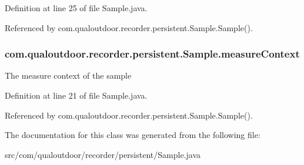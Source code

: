 Definition at line 25 of file Sample.\-java.



Referenced by com.\-qualoutdoor.\-recorder.\-persistent.\-Sample.\-Sample().

\hypertarget{classcom_1_1qualoutdoor_1_1recorder_1_1persistent_1_1Sample_a52c7340819515588f1e6d95ede6e2c4a}{
\subsubsection[{measure\-Context}]{ com.\-qualoutdoor.\-recorder.\-persistent.\-Sample.\-measure\-Context}}\label{classcom_1_1qualoutdoor_1_1recorder_1_1persistent_1_1Sample_a52c7340819515588f1e6d95ede6e2c4a}
The measure context of the sample 

Definition at line 21 of file Sample.\-java.



Referenced by com.\-qualoutdoor.\-recorder.\-persistent.\-Sample.\-Sample().



The documentation for this class was generated from the following file\-:\begin{DoxyCompactItemize}
\item 
src/com/qualoutdoor/recorder/persistent/Sample.\-java\end{DoxyCompactItemize}

